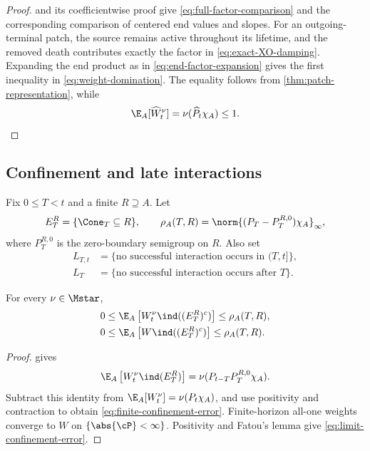 \begin{proof}
 and its coefficientwise proof give
\eqref{eq:full-factor-comparison} and the corresponding comparison of
centered end values and slopes. For an outgoing-terminal patch, the
source remains active throughout its lifetime, and the removed death
contributes exactly the factor in
\eqref{eq:exact-XO-damping}. Expanding the end product as in
\eqref{eq:end-factor-expansion} gives the first inequality in
\eqref{eq:weight-domination}. The equality follows from
\cref{thm:patch-representation}, while
\[
  \E_A[\widehat W_t^\nu]=\nu(\widehat P_t\chi_A)\le1.
\]
\end{proof}

\subsection{Confinement and late interactions}

\begin{notation}
\label{not:confinement-events}
Fix \(0\le T<t\) and a finite \(R\supseteq A\). Let
\[
  E_T^R=\{\Cone_T\subseteq R\},
\qquad
  \rho_A(T,R)
  =
  \norm{(P_T-P_T^{R,0})\chi_A}_\infty,
\]
where \(P_T^{R,0}\) is the zero-boundary semigroup on \(R\). Also set
\begin{align*}
  L_{T,t}
  &=
  \{\text{no successful interaction occurs in }(T,t]\},
  \\
  L_T
  &=
  \{\text{no successful interaction occurs after }T\}.
\end{align*}
\end{notation}

\begin{lemma}
\label{lem:confinement-bounds}
For every \(\nu\in\Mstar\),
\begin{align}
  0
  &\le
  \E_A\left[
    W_t^\nu\ind((E_T^R)^c)
  \right]
  \le
  \rho_A(T,R),
  \label{eq:finite-confinement-error}
  \\
  0
  &\le
  \E_A\left[
    W\ind((E_T^R)^c)
  \right]
  \le
  \rho_A(T,R).
  \label{eq:limit-confinement-error}
\end{align}
\end{lemma}

\begin{proof}
 gives
\[
  \E_A\left[W_t^\nu\ind(E_T^R)\right]
  =
  \nu(P_{t-T}P_T^{R,0}\chi_A).
\]
Subtract this identity from
\(\E_A[W_t^\nu]=\nu(P_t\chi_A)\), and use positivity and contraction
to obtain \eqref{eq:finite-confinement-error}. Finite-horizon all-one
weights converge to \(W\) on \(\{\abs{\cP}<\infty\}\). Positivity and
Fatou's lemma give \eqref{eq:limit-confinement-error}.
\end{proof}

